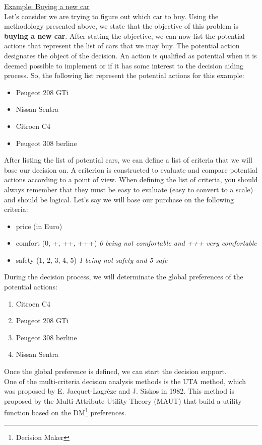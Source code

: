 \documentclass{report}
\begin{document}
\underline{Example: Buying a new car} \\
Let's consider we are trying to figure out which car to buy. Using the methodology presented above, we state that the objective of this problem is \textbf{buying a new car}. After stating the objective, we can now list the potential actions that represent the list of cars that we may buy. The potential action designates the object of the decision. An action is qualified as potential when it is deemed possible to implement or if it has some interest to the decision aiding process. So, the following list represent the potential actions for this example: 
\begin{itemize}
\item Peugeot 208 GTi
\item Nissan Sentra
\item Citroen C4
\item Peugeot 308 berline
\end{itemize}
After listing the list of potential cars, we can define a list of criteria that we will base our decision on. A criterion is constructed to evaluate and compare potential actions according to a point of view. When defining the list of criteria, you should always remember that they must be easy to evaluate (easy to convert to a scale) and should be logical.
Let's say we will base our purchase on the following criteria:
\begin{itemize}
\item price (in Euro)
\item comfort (0, +, ++, +++) \textit{0 being not comfortable and +++ very comfortable}
\item safety (1, 2, 3, 4, 5) \textit{1 being not safety and 5 safe}
\end{itemize}
During the decision process, we will determinate the global preferences of the potential actions:
\begin{enumerate}
\item Citroen C4
\item Peugeot 208 GTi
\item Peugeot 308 berline
\item Nissan Sentra
\end{enumerate}
Once the global preference is defined, we can start the decision support.\\

One of the multi-criteria decision analysis methods is the UTA method, which was proposed by E. Jacquet-Lagrèze and J. Siskos in 1982. This method is proposed by the Multi-Attribute Utility Theory (MAUT) that build a utility function based on the DM\footnote{Decision Maker} preferences.\\ 
\end{document}
